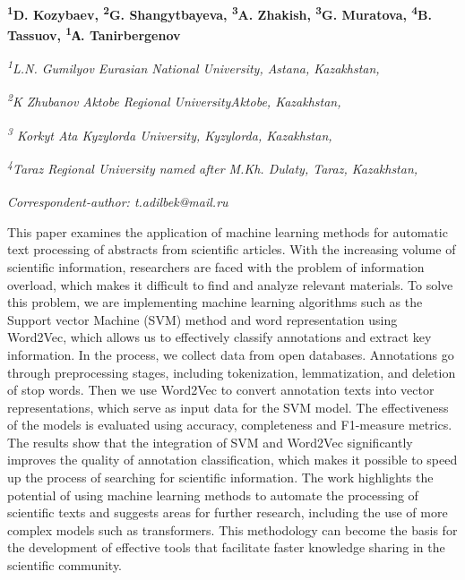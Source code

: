 
\begin{articleheader}

{\bfseries \textsuperscript{1}D. Kozybaev,
\textsuperscript{2}G. Shangytbayeva,
\textsuperscript{3}A. Zhakish,
\textsuperscript{3}G. Muratova,
\textsuperscript{4}B. Tassuov,
\textsuperscript{1}А. Tanirbergenov\textsuperscript{\envelope } }
\end{articleheader}

\begin{affiliation}
\emph{\textsuperscript{1}L.N. Gumilyov Eurasian National University, Astana, Kazakhstan,}

\emph{\textsuperscript{2}K Zhubanov Aktobe Regional UniversityAktobe, Kazakhstan,}

\emph{\textsuperscript{3} Korkyt Ata Kyzylorda University, Kyzylorda, Kazakhstan,}

\emph{\textsuperscript{4}Taraz Regional University named after M.Kh. Dulaty, Taraz, Kazakhstan,}

\raggedright {\em \textsuperscript{\envelope }Correspondent-author: t.adilbek@mail.ru}
\end{affiliation}

This paper examines the application of machine learning methods for
automatic text processing of abstracts from scientific articles. With
the increasing volume of scientific information, researchers are faced
with the problem of information overload, which makes it difficult to
find and analyze relevant materials. To solve this problem, we are
implementing machine learning algorithms such as the Support vector
Machine (SVM) method and word representation using Word2Vec, which
allows us to effectively classify annotations and extract key
information. In the process, we collect data from open databases.
Annotations go through preprocessing stages, including tokenization,
lemmatization, and deletion of stop words. Then we use Word2Vec to
convert annotation texts into vector representations, which serve as
input data for the SVM model. The effectiveness of the models is
evaluated using accuracy, completeness and F1-measure metrics. The
results show that the integration of SVM and Word2Vec significantly
improves the quality of annotation classification, which makes it
possible to speed up the process of searching for scientific
information. The work highlights the potential of using machine learning
methods to automate the processing of scientific texts and suggests
areas for further research, including the use of more complex models
such as transformers. This methodology can become the basis for the
development of effective tools that facilitate faster knowledge sharing
in the scientific community.

